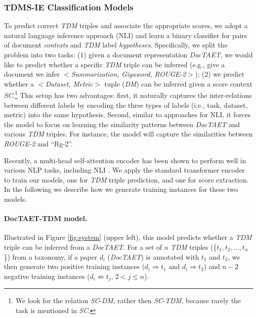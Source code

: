 \documentclass[11pt,a4paper]{article}
\begin{document}
\subsubsection{TDMS-IE Classification Models}
\label{sec:tdms-ie-train}
To predict correct \emph{TDM} triples and associate the appropriate scores, we adopt a natural language inference approach (NLI) \cite{poliak:etal:18} and learn a binary classifier for pairs of document \emph{contexts} and \emph{TDM} label \emph{hypotheses}.
Specifically, we split the problem into two tasks:  (1) given a document representation \emph{DocTAET}, we would like to predict whether a specific \emph{TDM} triple can be inferred (e.g., give a document we infer $<$\emph{Summarization, Gigaword, ROUGE-2}$>$); 
(2) we predict whether a $<$\emph{Dataset, Metric}$>$ tuple (\emph{DM}) can be inferred given a score context \emph{SC}.\footnote{We look for the relation \emph{SC}-\emph{DM}, rather then \emph{SC}-\emph{TDM}, because rarely the task is mentioned in \emph{SC}.}
This setup has two advantages: first, it naturally captures the inter-relations between different labels by encoding the three types of labels (i.e., task, dataset, metric) into the same hypothesis. 
Second, similar to approaches for NLI, it forces the model to focus on learning the similarity patterns between \emph{DocTAET} and various \emph{TDM} triples. For instance, the model will capture the similarities between \emph{ROUGE-2} and ``Rg-2''.

Recently, a multi-head self-attention encoder \cite{ashish17} has been shown to perform well in various NLP tasks, including NLI \cite{BERT}. 
We apply the standard transformer encoder \cite{BERT} to train our models, one for \emph{TDM} triple prediction, and one for score extraction. In the following we describe how we generate training instances for these two models.

\paragraph{DocTAET-TDM model.} Illustrated in Figure \ref{fig:system} (upper left), this model predicts whether a \emph{TDM} triple can be inferred from a \emph{DocTAET}. For a set of $n$ \emph{TDM} triples (\{$t_1, t_2, ..., t_n$\}) from a taxonomy, if a paper $d_i$ (\emph{DocTAET}) is annotated with $t_1$ and $t_2$, we then generate two positive training instances ($d_i \Rightarrow t_1$ and $d_i \Rightarrow t_2$) and $n-2$ negative training instances ($d_i \not \Rightarrow t_j$, $2<j \leq n$).
\end{document}
